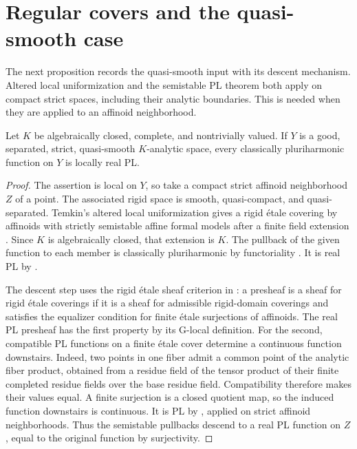 \documentclass[11pt,a4paper]{amsart}
\begin{document}
\section{Regular covers and the quasi-smooth case}\label{sec:regular-covers}

The next proposition records the quasi-smooth input with its descent mechanism. Altered local uniformization and the semistable PL theorem both apply on compact strict spaces, including their analytic boundaries. This is needed when they are applied to an affinoid neighborhood.

\begin{proposition}\label{prop:quasismooth-input}
Let $K$ be algebraically closed, complete, and nontrivially valued. If $Y$ is a good, separated, strict, quasi-smooth $K$-analytic space, every classically pluriharmonic function on $Y$ is locally real PL.
\end{proposition}

\begin{proof}
The assertion is local on $Y$, so take a compact strict affinoid neighborhood $Z$ of a point. The associated rigid space is smooth, quasi-compact, and quasi-separated. Temkin's altered local uniformization gives a rigid \'{e}tale covering by affinoids with strictly semistable affine formal models after a finite field extension \cite[Corollary~3.3.2]{Temkin17}. Since $K$ is algebraically closed, that extension is $K$. The pullback of the given function to each member is classically pluriharmonic by functoriality \cite[Proposition~7.2(7)]{GR25Classical}. It is real PL by \cite[Proposition~7.8]{GR25Classical}.

The descent step uses the rigid \'{e}tale sheaf criterion in \cite[Proposition~3.2.2]{dJvdP96}: a presheaf is a sheaf for rigid \'{e}tale coverings if it is a sheaf for admissible rigid-domain coverings and satisfies the equalizer condition for finite \'{e}tale surjections of affinoids. The real PL presheaf has the first property by its G-local definition. For the second, compatible PL functions on a finite \'{e}tale cover determine a continuous function downstairs. Indeed, two points in one fiber admit a common point of the analytic fiber product, obtained from a residue field of the tensor product of their finite completed residue fields over the base residue field. Compatibility therefore makes their values equal. A finite surjection is a closed quotient map, so the induced function downstairs is continuous. It is PL by , applied on strict affinoid neighborhoods. Thus the semistable pullbacks descend to a real PL function on $Z$, equal to the original function by surjectivity.
\end{proof}
\end{document}
